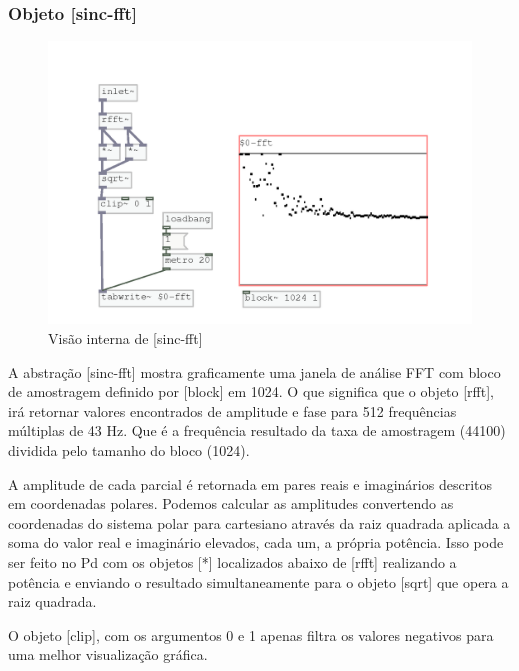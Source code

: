 \documentclass[draft]{ppgmus}
\begin{document}

\subsubsection{Objeto [sinc-fft]}


\begin{figure}
\includegraphics[scale=.55]{sinc-fft}
\caption{Visão interna de [sinc-fft]}
\label{sinc-fft}
\end{figure}



A abstração [sinc-fft] mostra graficamente uma janela de análise FFT com bloco de amostragem
definido por [block\texttildelow] em 1024. O que significa que o objeto [rfft\texttildelow],
irá retornar valores encontrados de amplitude e fase para 512 frequências múltiplas de 43 Hz.
Que é a frequência resultado da taxa de amostragem (44100) dividida pelo tamanho do bloco (1024).

A amplitude de cada parcial é retornada em pares reais e imaginários descritos em coordenadas
polares. Podemos calcular as amplitudes convertendo as coordenadas do sistema polar para cartesiano 
através da raiz quadrada aplicada
a soma do valor real e imaginário elevados, cada um, a própria potência. Isso pode ser feito no Pd com os
objetos [*\texttildelow] localizados abaixo de [rfft\texttildelow] realizando a potência e enviando o resultado 
simultaneamente para o objeto [sqrt\texttildelow] que opera a raiz quadrada.

O objeto [clip\texttildelow], com os argumentos 0 e 1 apenas filtra os valores negativos para uma
melhor visualização gráfica.
\end{document}
